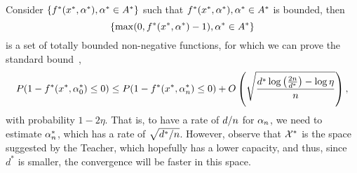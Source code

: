 Consider $\left\{f^*(x^*, \alpha^*), \alpha^* \in A^*\right\}$ such that $f^*(x^*, \alpha^*), \alpha^* \in A^*$ is bounded, then 
$$\left\{\max(0, f^*(x^*, \alpha^*)- 1), \alpha^* \in A^*\right\}$$
 is a set of totally bounded non-negative functions, for which we can prove the standard bound~\citep{Vapnik00},
\begin{equation}
    \nonumber
    P(1 - f^*(x^*, \alpha^*_0) \leq 0) \leq P(1 - f^*(x^*, \alpha^*_n) \leq 0) + O\left( \sqrt{\frac{d^* \log\left(\frac{2n}{d^*} \right) - \log\eta}{n}}  \right) ,
\end{equation}
with probability $1 - 2\eta$.
That is, to have a rate of $d/n$ for $\alpha_n$, we need to estimate $\alpha^*_n$, which has a rate of $\sqrt{d^*/n}$. However, observe that $\mathcal{X}^*$ is the space suggested by the Teacher, which hopefully has a lower capacity, and thus, since $d^*$ is smaller, the convergence will be faster in this space.

